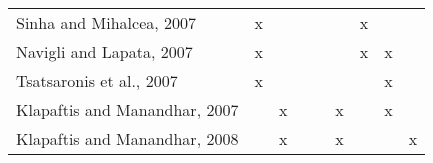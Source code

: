 \begin{table}[]
\begin{tabular}{l|cccc|cccc}
Sinha and Mihalcea, 2007 \cite{2007.Sinha.Mihalcea.Unsupervised}                 & x                                  &                                   &                                     &                                         &                                                                                  & x                                      &                                                 &                                                                                      \\
Navigli and Lapata, 2007\cite{2007.Navigli.GraphConnectivity}                    & x                                  &                                   &                                     &                                         &                                                                                  & x                                      & x                                               &                                                                                      \\
Tsatsaronis et al., 2007 \cite{2007.Tsatsaronis.WSDwithSpreading}                & x                                  &                                   &                                     &                                         &                                                                                  &                                        & x                                               &                                                                                      \\
Klapaftis and Manandhar, 2007 \cite{2007.Klapaftis.UOY}                          &                                    & x                                 &                                     &                                         & x                                                                                &                                        & x                                               &                                                                                      \\
Klapaftis and Manandhar, 2008 \cite{2008.Klapaftis.WSIUsingCollocations}         &                                    & x                                 &                                     &                                         & x                                                                                &                                        &                                                 & x                                                                                    \\

\end{tabular}
\end{table}
